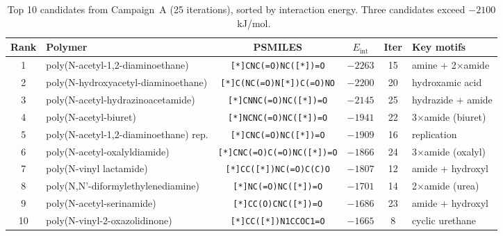 \documentclass[twocolumn]{fairmeta}
\begin{document}
\begin{table}[t]
\centering
\caption{Top 10 candidates from Campaign~A (25 iterations), sorted by interaction energy. Three candidates exceed $-2100$~kJ/mol.}
\label{tab:agentic_top}
\small
\begin{tabular}{clcccl}
\toprule
\textbf{Rank} & \textbf{Polymer} & \textbf{PSMILES} & \textbf{$E_\text{int}$} & \textbf{Iter} & \textbf{Key motifs} \\
\midrule
1  & poly(N-acetyl-1,2-diaminoethane) & \texttt{\footnotesize [*]CNC(=O)NC([*])=O} & $-2263$ & 15 & amine + 2$\times$amide \\
2  & poly(N-hydroxyacetyl-diaminoethane) & \texttt{\footnotesize [*]C(NC(=O)N[*])C(=O)NO} & $-2200$ & 20 & hydroxamic acid \\
3  & poly(N-acetyl-hydrazinoacetamide) & \texttt{\footnotesize [*]CNNC(=O)NC([*])=O} & $-2145$ & 25 & hydrazide + amide \\
4  & poly(N-acetyl-biuret) & \texttt{\footnotesize [*]NCNC(=O)NC([*])=O} & $-1941$ & 22 & 3$\times$amide (biuret) \\
5  & poly(N-acetyl-1,2-diaminoethane) rep. & \texttt{\footnotesize [*]CNC(=O)NC([*])=O} & $-1909$ & 16 & replication \\
6  & poly(N-acetyl-oxalyldiamide) & \texttt{\footnotesize [*]CNC(=O)C(=O)NC([*])=O} & $-1866$ & 24 & 3$\times$amide (oxalyl) \\
7  & poly(N-vinyl lactamide) & \texttt{\footnotesize [*]CC([*])NC(=O)C(C)O} & $-1807$ & 12 & amide + hydroxyl \\
8  & poly(N,N'-diformylethylenediamine) & \texttt{\footnotesize [*]NC(=O)NC([*])=O} & $-1701$ & 14 & 2$\times$amide (urea) \\
9  & poly(N-acetyl-serinamide) & \texttt{\footnotesize [*]CC(O)CNC([*])=O} & $-1686$ & 23 & amide + hydroxyl \\
10 & poly(N-vinyl-2-oxazolidinone) & \texttt{\footnotesize [*]CC([*])N1CCOC1=O} & $-1665$ & 8  & cyclic urethane \\
\bottomrule
\end{tabular}
\end{table}
\end{document}
